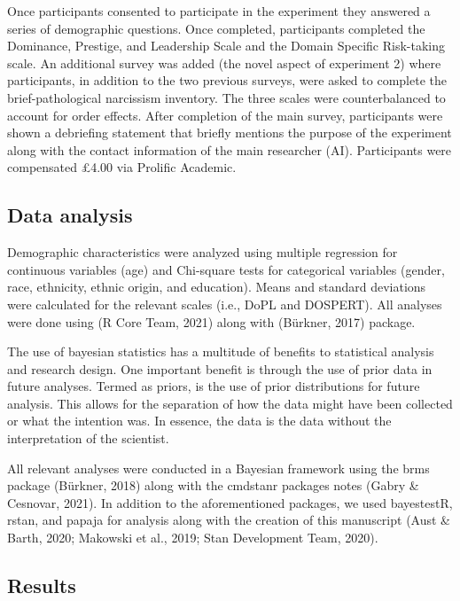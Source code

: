 \documentclass[
  donotrepeattitle,doc, 12pt, a4paper,floatsintext]{apa7}
\begin{document}
Once participants consented to participate in the experiment they answered a series of demographic questions. Once completed, participants completed the Dominance, Prestige, and Leadership Scale and the Domain Specific Risk-taking scale. An additional survey was added (the novel aspect of experiment 2) where participants, in addition to the two previous surveys, were asked to complete the brief-pathological narcissism inventory. The three scales were counterbalanced to account for order effects. After completion of the main survey, participants were shown a debriefing statement that briefly mentions the purpose of the experiment along with the contact information of the main researcher (AI). Participants were compensated £4.00 via Prolific Academic.

\hypertarget{data-analysis-1}{%
\subsection{Data analysis}\label{data-analysis-1}}

Demographic characteristics were analyzed using multiple regression for continuous variables (age) and Chi-square tests for categorical variables (gender, race, ethnicity, ethnic origin, and education). Means and standard deviations were calculated for the relevant scales (i.e., DoPL and DOSPERT). All analyses were done using (R Core Team, 2021) along with (Bürkner, 2017) package.

The use of bayesian statistics has a multitude of benefits to statistical analysis and research design. One important benefit is through the use of prior data in future analyses. Termed as priors, is the use of prior distributions for future analysis. This allows for the separation of how the data might have been collected or what the intention was. In essence, the data is the data without the interpretation of the scientist.

All relevant analyses were conducted in a Bayesian framework using the brms package (Bürkner, 2018) along with the cmdstanr packages notes (Gabry \& Cesnovar, 2021). In addition to the aforementioned packages, we used bayestestR, rstan, and papaja for analysis along with the creation of this manuscript (Aust \& Barth, 2020; Makowski et al., 2019; Stan Development Team, 2020).

\hypertarget{results-1}{%
\subsection{Results}\label{results-1}}
\end{document}
